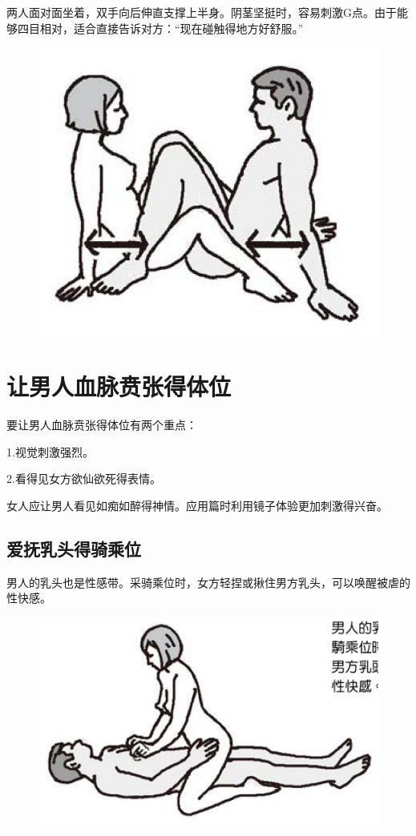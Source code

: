 \documentclass[12pt,UTF8]{ctexbook}
\begin{document}
两人面对面坐着，双手向后伸直支撑上半身。阴茎坚挺时，容易刺激G点。由于能够四目相对，适合直接告诉对方：“现在碰触得地方好舒服。”

\begin{figure}[htbp]
\centering
\includegraphics[width=0.7\linewidth]{tw27}
\caption{}
\label{fig:1}
\end{figure}

\section{让男人血脉贲张得体位}

要让男人血脉贲张得体位有两个重点：

1.视觉刺激强烈。

2.看得见女方欲仙欲死得表情。

女人应让男人看见如痴如醉得神情。应用篇时利用镜子体验更加刺激得兴奋。

\subsection{爱抚乳头得骑乘位}

男人的乳头也是性感带。采骑乘位时，女方轻捏或揪住男方乳头，可以唤醒被虐的性快感。

\begin{figure}[htbp]
\centering
\includegraphics[width=0.7\linewidth]{tw28}
\caption{}
\label{fig:1}
\end{figure}
\end{document}
